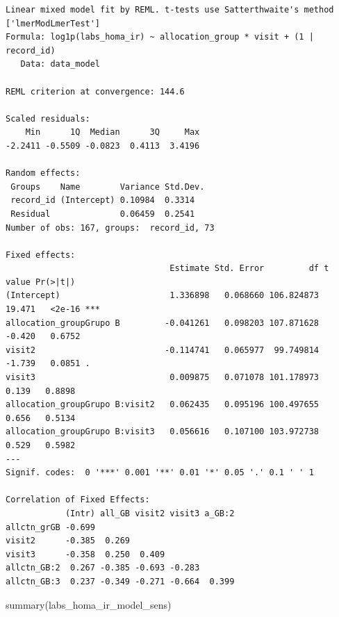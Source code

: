 \documentclass[
  12pt,
]{article}
\newenvironment{Shaded}{\begin{snugshade}}{\end{snugshade}}
\newcommand{\FunctionTok}[1]{\textcolor[rgb]{0.28,0.35,0.67}{#1}}
\newcommand{\NormalTok}[1]{\textcolor[rgb]{0.00,0.23,0.31}{#1}}
\begin{document}
\begin{verbatim}
Linear mixed model fit by REML. t-tests use Satterthwaite's method ['lmerModLmerTest']
Formula: log1p(labs_homa_ir) ~ allocation_group * visit + (1 | record_id)
   Data: data_model

REML criterion at convergence: 144.6

Scaled residuals: 
    Min      1Q  Median      3Q     Max 
-2.2411 -0.5509 -0.0823  0.4113  3.4196 

Random effects:
 Groups    Name        Variance Std.Dev.
 record_id (Intercept) 0.10984  0.3314  
 Residual              0.06459  0.2541  
Number of obs: 167, groups:  record_id, 73

Fixed effects:
                                 Estimate Std. Error         df t value Pr(>|t|)    
(Intercept)                      1.336898   0.068660 106.824873  19.471   <2e-16 ***
allocation_groupGrupo B         -0.041261   0.098203 107.871628  -0.420   0.6752    
visit2                          -0.114741   0.065977  99.749814  -1.739   0.0851 .  
visit3                           0.009875   0.071078 101.178973   0.139   0.8898    
allocation_groupGrupo B:visit2   0.062435   0.095196 100.497655   0.656   0.5134    
allocation_groupGrupo B:visit3   0.056616   0.107100 103.972738   0.529   0.5982    
---
Signif. codes:  0 '***' 0.001 '**' 0.01 '*' 0.05 '.' 0.1 ' ' 1

Correlation of Fixed Effects:
            (Intr) all_GB visit2 visit3 a_GB:2
allctn_grGB -0.699                            
visit2      -0.385  0.269                     
visit3      -0.358  0.250  0.409              
allctn_GB:2  0.267 -0.385 -0.693 -0.283       
allctn_GB:3  0.237 -0.349 -0.271 -0.664  0.399
\end{verbatim}

\begin{Shaded}
\begin{Highlighting}[]
\FunctionTok{summary}\NormalTok{(labs\_homa\_ir\_model\_sens)}
\end{Highlighting}
\end{Shaded}
\end{document}
